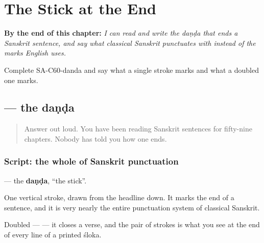 
\chapter{The Stick at the End}
\label{ch:sa-the-stick-at-the-end}

\begin{chapteropening}
\textbf{By the end of this chapter:} \emph{I can read and write the daṇḍa that ends a Sanskrit sentence, and say what classical Sanskrit punctuates with instead of the marks English uses.}

Complete SA-C60-danda and say what a single stroke marks and what a doubled one marks.
\end{chapteropening}

\section[\texorpdfstring{\sk{।} (daṇḍa)}{। (daṇḍa)}]{ — the daṇḍa}

\label{lesson:SA-C60-danda}



\begin{quote}
Answer \textbf{} out loud. You have been reading Sanskrit sentences for fifty-nine chapters. Nobody has told you how one ends.
\end{quote}

\subsection*{Script: the whole of Sanskrit punctuation}
\textbf{} — the \textbf{daṇḍa}, \textquotedblleft{}the stick\textquotedblright{}.

One vertical stroke, drawn from the headline down. It marks the end of a sentence, and it is very nearly the entire punctuation system of classical Sanskrit.

\begin{quote}
\textbf{  }
\end{quote}

\begin{quote}
\textbf{   }
\end{quote}

Doubled — \textbf{} — it closes a verse, and the pair of strokes is what you see at the end of every line of a printed śloka.

